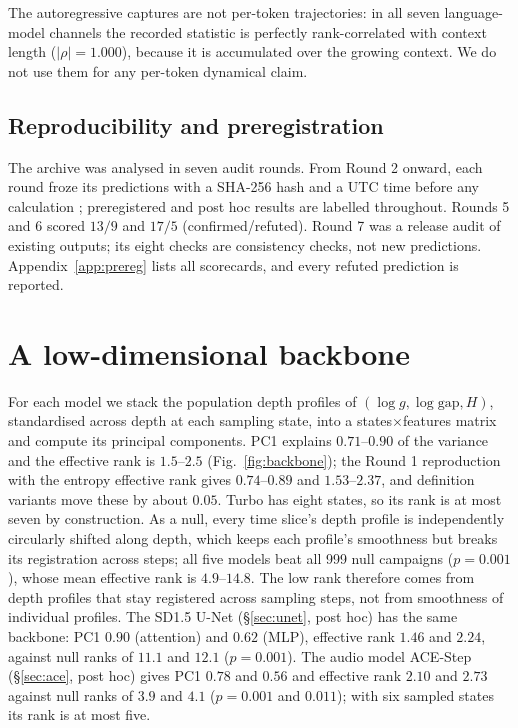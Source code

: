 \documentclass[11pt]{article}
\newcommand{\gap}{\mathrm{gap}}
\begin{document}
The autoregressive captures are not per-token trajectories: in all seven language-model channels the recorded statistic is perfectly rank-correlated with context length ($|\rho|=1.000$), because it is accumulated over the growing context. We do not use them for any per-token dynamical claim.

\subsection{Reproducibility and preregistration}
The archive was analysed in seven audit rounds. From Round 2 onward, each round froze its predictions with a SHA-256 hash and a UTC time before any calculation \citep{nosek2018preregistration,simmons2011false}; preregistered and post hoc results are labelled throughout. Rounds 5 and 6 scored $13/9$ and $17/5$ (confirmed/refuted). Round 7 was a release audit of existing outputs; its eight checks are consistency checks, not new predictions. Appendix~\ref{app:prereg} lists all scorecards, and every refuted prediction is reported.

\section{A low-dimensional backbone}\label{sec:backbone}

For each model we stack the population depth profiles of $(\log g,\log\gap,H)$, standardised across depth at each sampling state, into a states$\times$features matrix and compute its principal components. PC1 explains $0.71$--$0.90$ of the variance and the effective rank is $1.5$--$2.5$ (Fig.~\ref{fig:backbone}); the Round 1 reproduction with the entropy effective rank gives $0.74$--$0.89$ and $1.53$--$2.37$, and definition variants move these by about $0.05$. Turbo has eight states, so its rank is at most seven by construction. As a null, every time slice's depth profile is independently circularly shifted along depth, which keeps each profile's smoothness but breaks its registration across steps; all five models beat all 999 null campaigns ($p=0.001$), whose mean effective rank is $4.9$--$14.8$. The low rank therefore comes from depth profiles that stay registered across sampling steps, not from smoothness of individual profiles. The SD1.5 U-Net (\S\ref{sec:unet}, post hoc) has the same backbone: PC1 $0.90$ (attention) and $0.62$ (MLP), effective rank $1.46$ and $2.24$, against null ranks of $11.1$ and $12.1$ ($p=0.001$). The audio model ACE-Step (\S\ref{sec:ace}, post hoc) gives PC1 $0.78$ and $0.56$ and effective rank $2.10$ and $2.73$ against null ranks of $3.9$ and $4.1$ ($p=0.001$ and $0.011$); with six sampled states its rank is at most five.
\end{document}
